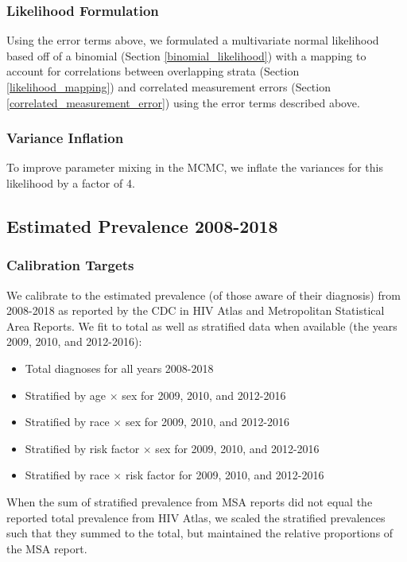 \documentclass{article}
\begin{document}
\subsubsection{Likelihood Formulation}

Using the error terms above, we formulated a multivariate normal likelihood based off of a binomial (Section \ref{binomial_likelihood}) with a mapping to account for correlations between overlapping strata (Section \ref{likelihood_mapping}) and correlated measurement errors (Section \ref{correlated_measurement_error}) using the error terms described above.

\subsubsection{Variance Inflation}
To improve parameter mixing in the MCMC, we inflate the variances for this likelihood by a factor of 4.


\subsection{Estimated Prevalence 2008-2018}

\subsubsection{Calibration Targets}
We calibrate to the estimated prevalence (of those aware of their diagnosis) from 2008-2018 as reported by the CDC in HIV Atlas\cite{hivatlas} and Metropolitan Statistical Area Reports\cite{msa2010,msa2011,msa2013,msa2014,msa2015,msa2016,cdc24.2}. We fit to total as well as stratified data when available (the years 2009, 2010, and 2012-2016):
\begin{itemize}
	\item Total diagnoses for all years 2008-2018
	\item Stratified by age $\times$ sex for 2009, 2010, and 2012-2016
	\item Stratified by race $\times$ sex for 2009, 2010, and 2012-2016
	\item Stratified by risk factor $\times$ sex for 2009, 2010, and 2012-2016
	\item Stratified by race $\times$ risk factor for 2009, 2010, and 2012-2016
\end{itemize}

When the sum of stratified prevalence from MSA reports did not equal the reported total prevalence from HIV Atlas, we scaled the stratified prevalences such that they summed to the total, but maintained the relative proportions of the MSA report.
\end{document}
